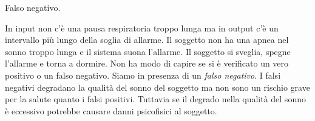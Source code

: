 \begin{bf}Falso negativo.\end{bf}
  In input non c'\`e una pausa respiratoria troppo lunga ma in output c'\`e un intervallo pi\`u lungo della soglia di allarme.
  Il soggetto non ha una apnea nel sonno troppo lunga e il sistema suona l'allarme. 
  Il soggetto si sveglia, spegne l'allarme e torna a dormire. 
  Non ha modo di capire se si \`e verificato un vero positivo o un falso negativo.
  Siamo in presenza di un \emph{falso negativo}. 
  I falsi negativi degradano la qualit\`a del sonno del soggetto ma non sono un rischio grave per la salute quanto i falsi positivi.
  Tuttavia se il degrado nella qualit\`a del sonno \`e eccessivo potrebbe causare danni psicofisici al soggetto.



